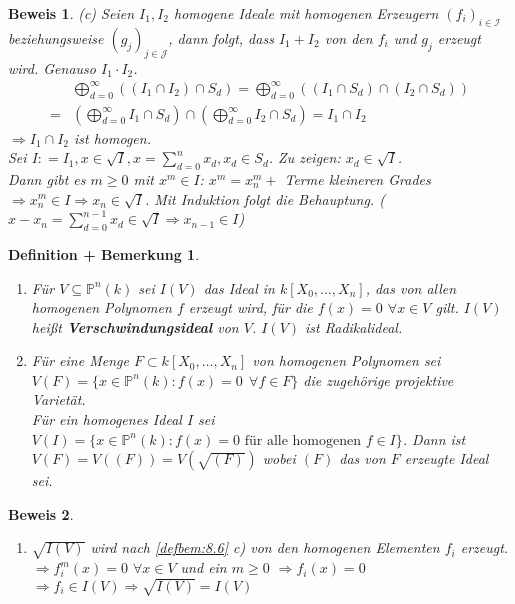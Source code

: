 \documentclass[a4paper,12pt]{report}
\theoremstyle{break}
\newtheorem{DefBem}[Def]{Definition + Bemerkung}
\theoremstyle{nonumberbreak}
\theoremstyle{nonumberplain}
\newtheorem{Bew}{Beweis}
\newcommand{\emp}[1]{\textbf{\emph{#1}}}
\newcommand{\begriff}[1]{{\index{#1}}\emp{#1}}
\newcommand{\defeqr}[0]{\mathrel{\mathop:}=}
\begin{document}
\begin{Bew}
  (c) Seien $I_1,I_2$ homogene Ideale mit homogenen Erzeugern $(f_i)_{i\in \mathcal I}$ beziehungsweise
    $(g_j)_{j\in \mathcal J}$, dann folgt, dass $I_1+I_2$ von den $f_i$ und $g_j$ erzeugt wird. Genauso $I_1\cdot I_2$. \\
    \begin{align*}
      & \bigoplus_{d=0}^\infty((I_1\cap I_2)\cap S_d)=\bigoplus_{d=0}^\infty((I_1\cap S_d)\cap (I_2\cap S_d)) \\
      = & \left(\bigoplus_{d=0}^\infty I_1\cap S_d\right)\cap \left(\bigoplus_{d=0}^\infty I_2\cap S_d\right)=I_1\cap I_2
    \end{align*}
    $\Rightarrow I_1\cap I_2$ ist homogen.\\
    Sei $I\defeqr I_1, x\in\sqrt{I},x=\sum_{d=0}^nx_d,x_d\in S_d$. Zu zeigen: $x_d\in\sqrt{I}$.\\
    Dann gibt es $m\geq 0$ mit $x^m\in I$: $x^m=x_n^m+$ Terme kleineren Grades \\
    $\Rightarrow x_n^m\in I \Rightarrow x_n\in\sqrt{I}$. Mit Induktion folgt die Behauptung. ($x-x_n=\sum_{d=0}^{n-1}x_d\in\sqrt{I}\Rightarrow x_{n-1}\in I$)
 \end{Bew}
\begin{DefBem}
 \begin{enumerate}
  \item Für $V \subseteq \mathbb P^n(k)$ sei $I(V)$ das Ideal in $k[X_0,\dots,X_n]$, das von allen homogenen Polynomen $f$ erzeugt wird, für die $f(x)=0 $ $\forall x \in V$ gilt. $I(V)$ heißt \begriff{Verschwindungsideal} von $V$. $I(V)$ ist Radikalideal.
  \item Für eine Menge $F \subset k[X_0,\dots,X_n]$ von homogenen Polynomen sei $V(F)=\{ x \in \mathbb P^n(k):f(x)=0~~ \forall f \in F \}$ die zugehörige projektive Varietät. \\ 
  Für ein homogenes Ideal $I$ sei $V(I)=\{ x \in \mathbb P^n(k):f(x)=0  \text{ für alle homogenen } f \in I \} $. Dann ist $V(F)=V((F))=V(\sqrt{(F)})$ wobei $(F)$ das von $F$ erzeugte Ideal sei.
 \end{enumerate}
\end{DefBem}
\begin{Bew}
 \begin{enumerate}
  \item $\sqrt{I(V)}$ wird nach \ref{defbem:8.6} c) von den homogenen Elementen $f_i$ erzeugt.\\
	$\Rightarrow f_i^m(x) = 0$ $\forall x \in V$ und ein $m \ge 0$ $\Rightarrow f_i(x)=0$ $\Rightarrow f_i \in I(V) \Rightarrow \sqrt{I(V)} = I(V)$
 \end{enumerate}
\end{Bew}
\end{document}
